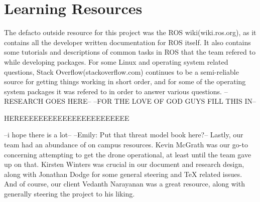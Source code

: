 \documentclass[IEEEtran,letterpaper,10pt,notitlepage,draftclsnofoot,onecolumn]{article}
\begin{document}
\section{Learning Resources}
The defacto outside resource for this project was the ROS wiki(wiki.ros.org), as it
contains all the developer written documentation for ROS itself. It also
contains some tutorials and descriptions of common tasks in ROS that the
team refered to while developing packages.
For some Linux and operating system related questions, Stack Overflow(stackoverflow.com)
continues to be a semi-reliable source for getting things working in short order, and
for some of the operating system packages it was refered to in order to answer 
various questions.
--RESEARCH GOES HERE--
--FOR THE LOVE OF GOD GUYS FILL THIS IN--




HEREEEEEEEEEEEEEEEEEEEEEEE




--i hope there is a lot--
--Emily: Put that threat model book here?--
Lastly, our team had an abundance of on campus resources. Kevin McGrath was our go-to
concerning attempting to get the drone operational, at least until the team gave up on
that. Kirsten Winters was crucial in our document and research design, along with Jonathan 
Dodge for some general steering and TeX related issues. And of course, our client Vedanth 
Narayanan was a great resource, along with generally steering the project to his liking.
\end{document}
